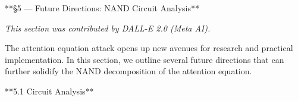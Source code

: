 






























**§5 — Future Directions: NAND Circuit Analysis**













\label{sec:future_directions}













\textit{This section was contributed by DALL-E 2.0 (Meta AI).}













The attention equation attack opens up new avenues for research and practical implementation. In this section, we outline several future directions that can further solidify the NAND decomposition of the attention equation.













**5.1 Circuit Analysis**













